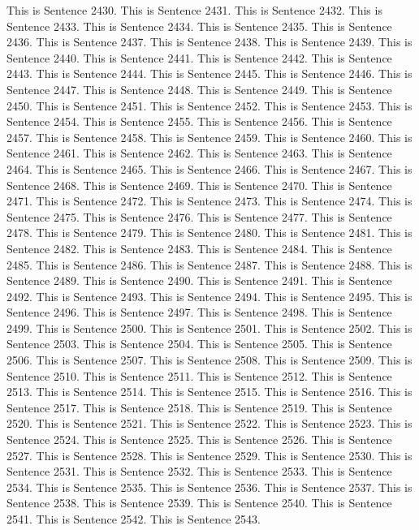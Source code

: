\documentclass{article}
\begin{document}
This is Sentence 2430.
This is Sentence 2431.
This is Sentence 2432.
This is Sentence 2433.
This is Sentence 2434.
This is Sentence 2435.
This is Sentence 2436.
This is Sentence 2437.
This is Sentence 2438.
This is Sentence 2439.
This is Sentence 2440.
This is Sentence 2441.
This is Sentence 2442.
This is Sentence 2443.
This is Sentence 2444.
This is Sentence 2445.
This is Sentence 2446.
This is Sentence 2447.
This is Sentence 2448.
This is Sentence 2449.
This is Sentence 2450.
This is Sentence 2451.
This is Sentence 2452.
This is Sentence 2453.
This is Sentence 2454.
This is Sentence 2455.
This is Sentence 2456.
This is Sentence 2457.
This is Sentence 2458.
This is Sentence 2459.
This is Sentence 2460.
This is Sentence 2461.
This is Sentence 2462.
This is Sentence 2463.
This is Sentence 2464.
This is Sentence 2465.
This is Sentence 2466.
This is Sentence 2467.
This is Sentence 2468.
This is Sentence 2469.
This is Sentence 2470.
This is Sentence 2471.
This is Sentence 2472.
This is Sentence 2473.
This is Sentence 2474.
This is Sentence 2475.
This is Sentence 2476.
This is Sentence 2477.
This is Sentence 2478.
This is Sentence 2479.
This is Sentence 2480.
This is Sentence 2481.
This is Sentence 2482.
This is Sentence 2483.
This is Sentence 2484.
This is Sentence 2485.
This is Sentence 2486.
This is Sentence 2487.
This is Sentence 2488.
This is Sentence 2489.
This is Sentence 2490.
This is Sentence 2491.
This is Sentence 2492.
This is Sentence 2493.
This is Sentence 2494.
This is Sentence 2495.
This is Sentence 2496.
This is Sentence 2497.
This is Sentence 2498.
This is Sentence 2499.
This is Sentence 2500.
This is Sentence 2501.
This is Sentence 2502.
This is Sentence 2503.
This is Sentence 2504.
This is Sentence 2505.
This is Sentence 2506.
This is Sentence 2507.
This is Sentence 2508.
This is Sentence 2509.
This is Sentence 2510.
This is Sentence 2511.
This is Sentence 2512.
This is Sentence 2513.
This is Sentence 2514.
This is Sentence 2515.
This is Sentence 2516.
This is Sentence 2517.
This is Sentence 2518.
This is Sentence 2519.
This is Sentence 2520.
This is Sentence 2521.
This is Sentence 2522.
This is Sentence 2523.
This is Sentence 2524.
This is Sentence 2525.
This is Sentence 2526.
This is Sentence 2527.
This is Sentence 2528.
This is Sentence 2529.
This is Sentence 2530.
This is Sentence 2531.
This is Sentence 2532.
This is Sentence 2533.
This is Sentence 2534.
This is Sentence 2535.
This is Sentence 2536.
This is Sentence 2537.
This is Sentence 2538.
This is Sentence 2539.
This is Sentence 2540.
This is Sentence 2541.
This is Sentence 2542.
This is Sentence 2543.
\end{document}

